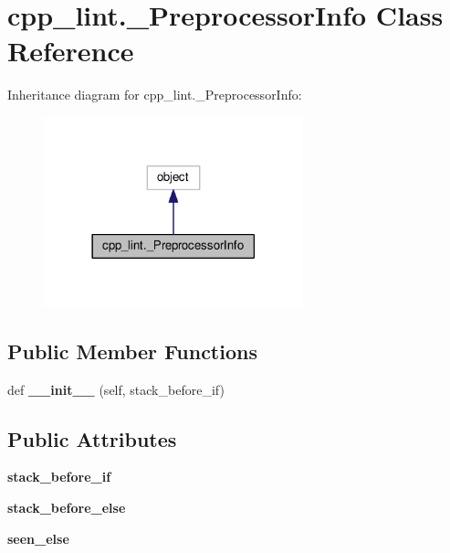 \hypertarget{classcpp__lint_1_1___preprocessor_info}{}\section{cpp\+\_\+lint.\+\_\+\+Preprocessor\+Info Class Reference}
\label{classcpp__lint_1_1___preprocessor_info}


Inheritance diagram for cpp\+\_\+lint.\+\_\+\+Preprocessor\+Info\+:
\nopagebreak
\begin{figure}[H]
\begin{center}
\leavevmode
\includegraphics[width=213pt]{classcpp__lint_1_1___preprocessor_info__inherit__graph}
\end{center}
\end{figure}
\subsection*{Public Member Functions}
\begin{DoxyCompactItemize}
\item 
\mbox{\label{classcpp__lint_1_1___preprocessor_info_acbf7b2871404c90c8ccef1aa6ccaa30f}} 
def {\bfseries \+\_\+\+\_\+init\+\_\+\+\_\+} (self, stack\+\_\+before\+\_\+if)
\end{DoxyCompactItemize}
\subsection*{Public Attributes}
\begin{DoxyCompactItemize}
\item 
\mbox{\label{classcpp__lint_1_1___preprocessor_info_a8218fb8f66a870a481350fb2a230c599}} 
{\bfseries stack\+\_\+before\+\_\+if}
\item 
\mbox{\label{classcpp__lint_1_1___preprocessor_info_a2bf5b30bbfe7f15a40da1f942daac6d5}} 
{\bfseries stack\+\_\+before\+\_\+else}
\item 
\mbox{\label{classcpp__lint_1_1___preprocessor_info_ab6d714c480e5fa778619835468510834}} 
{\bfseries seen\+\_\+else}
\end{DoxyCompactItemize}


